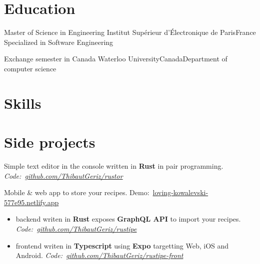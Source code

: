 \documentclass[11pt,a4paper]{moderncv}
\begin{document}
\section{Education}
{Master of Science in Engineering}
{Institut Supérieur d'Électronique de Paris}{France}
{Specialized in Software Engineering}{}

{Exchange semester in Canada}
{Waterloo University}{Canada}{Department of computer science}{}


\section{Skills}
\vspace{1mm}

\clearpage

\section{Side projects}
{Simple text editor in the console written in \textbf{Rust} in pair programming. 
\textit{Code:~\href{https://github.com/ThibautGeriz/rustor}{github.com/ThibautGeriz/rustor} }}
{
Mobile \& web app to store your recipes. Demo:~\href{https://loving-kowalevski-577e95.netlify.app}{loving-kowalevski-577e95.netlify.app}
\begin{itemize}
\item backend writen in \textbf{Rust} exposes \textbf{GraphQL API} to import your recipes.
\textit{Code:~\href{https://github.com/ThibautGeriz/rustipe}{github.com/ThibautGeriz/rustipe}}
\item frontend writen in \textbf{Typescript} using \textbf{Expo} targetting Web, iOS and Android. 
\textit{Code:~\href{https://github.com/ThibautGeriz/rustipe-front}{github.com/ThibautGeriz/rustipe-front}}
\end{itemize}
}

\end{document}
